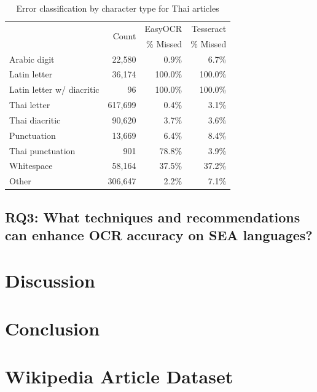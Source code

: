 \documentclass[12pt,oneside]{memoir}
\begin{document}
\begin{table}[ht]
    \caption{Error classification by character type for Thai articles}
    \label{table:thai-error-classification}
    \centering
    \begin{tabular}{lrrr}
        \toprule
        & \multirow{2}{*}{Count} & EasyOCR & Tesseract\\
        & & \% Missed & \% Missed\\
        \midrule
        Arabic digit & 22,580 & 0.9\% & 6.7\%\\
        Latin letter & 36,174 & 100.0\% & 100.0\%\\
        Latin letter w/ diacritic & 96 & 100.0\% & 100.0\%\\
        Thai letter & 617,699 & 0.4\% & 3.1\%\\
        Thai diacritic & 90,620 & 3.7\% & 3.6\%\\
        Punctuation & 13,669 & 6.4\% & 8.4\%\\
        Thai punctuation & 901 & 78.8\% & 3.9\%\\
        Whitespace & 58,164 & 37.5\% & 37.2\%\\
        Other & 306,647 & 2.2\% & 7.1\%\\
        \bottomrule
    \end{tabular}
\end{table}

\section{RQ3: What techniques and recommendations can enhance OCR accuracy on SEA languages?}

\chapter{Discussion}

\chapter{Conclusion}

\printbibliography[title={References}]

\clearpage
\appendix
\renewcommand{\chaptername}{Appendix}

\chapter{Wikipedia Article Dataset}
\end{document}
